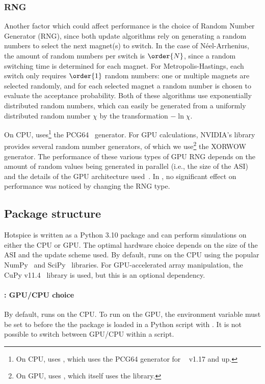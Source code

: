 \subsubsection{RNG}
Another factor which could affect performance is the choice of Random Number Generator (RNG), since both update algorithms rely on generating a random numbers to select the next magnet(s) to switch.
In the case of Néel-Arrhenius, the amount of random numbers per switch is $\order{N}$, since a random switching time is determined for each magnet.
For Metropolis-Hastings, each switch only requires $\order{1}$ random numbers: one or multiple magnets are selected randomly, and for each selected magnet a random number is chosen to evaluate the acceptance probability.
Both of these algorithms use exponentially distributed random numbers, which can easily be generated from a uniformly distributed random number $\chi$ by the transformation $-\ln{\chi}$. \par
On CPU, \hotspice uses\footnote{
	On CPU, \hotspice uses , which uses the PCG64 generator for ~\cite{NumPy} v1.17 and up.
} the PCG64~\cite{PCG64} generator.
For GPU calculations, NVIDIA's  library provides several random number generators, of which we use\footnote{
	On GPU, \hotspice uses , which itself uses the  library.
} the XORWOW~\cite{XORWOW} generator.
The performance of these various types of GPU RNG depends on the amount of random values being generated in parallel (i.e., the size of the ASI) and the details of the GPU architecture used~\cite{RNG_GPU_evaluation}.
In \hotspice, no significant effect on performance was noticed by changing the RNG type.

\subsection{Package structure} %
Hotspice is written as a Python 3.10 package and can perform simulations on either the CPU or GPU.
The optimal hardware choice depends on the size of the ASI and the update scheme used.
By default, \hotspice runs on the CPU using the popular NumPy~\cite{NumPy} and SciPy~\cite{SciPy} libraries.
For GPU-accelerated array manipulation, the CuPy v11.4~\cite{CuPy} library is used, but this is an optional dependency. \par
\paragraph{: GPU/CPU choice}
By default, \hotspice runs on the CPU. To run on the GPU, the environment variable  must be set to  before the the \hotspice package is loaded in a Python script with . It is not possible to switch between GPU/CPU within a script.
